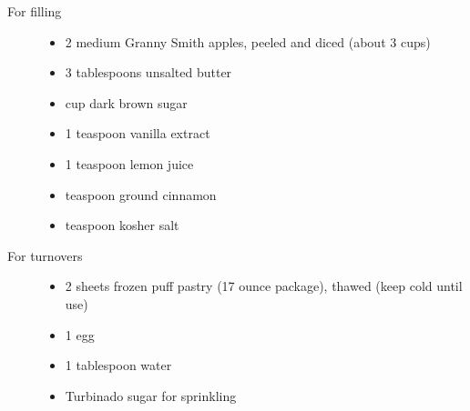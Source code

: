 \begin{description}
  \item[For filling]\hfill
    \begin{itemize}
      \item 2 medium Granny Smith apples, peeled and diced (about 3 cups)
      \item 3 tablespoons unsalted butter
      \item {} cup dark brown sugar
      \item 1 teaspoon vanilla extract
      \item 1 teaspoon lemon juice
      \item {} teaspoon ground cinnamon
      \item {} teaspoon kosher salt
    \end{itemize}
  \item[For turnovers]\hfill
    \begin{itemize}
      \item 2 sheets frozen puff pastry (17 ounce package), thawed (keep cold until use)
      \item 1 egg
      \item 1 tablespoon water
      \item Turbinado sugar for sprinkling
    \end{itemize}
\end{description}

